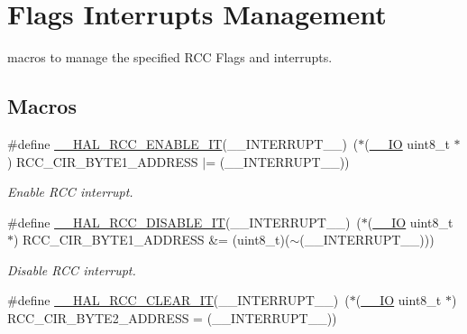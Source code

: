 \hypertarget{group___r_c_c___flags___interrupts___management}{\section{Flags Interrupts Management}
\label{group___r_c_c___flags___interrupts___management}
}


macros to manage the specified R\-C\-C Flags and interrupts.  


\subsection*{Macros}
\begin{DoxyCompactItemize}
\item 
\#define \hyperlink{group___r_c_c___flags___interrupts___management_ga180fb20a37b31a6e4f7e59213a6c0405}{\-\_\-\-\_\-\-H\-A\-L\-\_\-\-R\-C\-C\-\_\-\-E\-N\-A\-B\-L\-E\-\_\-\-I\-T}(\-\_\-\-\_\-\-I\-N\-T\-E\-R\-R\-U\-P\-T\-\_\-\-\_\-)~($\ast$(\hyperlink{core__sc300_8h_aec43007d9998a0a0e01faede4133d6be}{\-\_\-\-\_\-\-I\-O} uint8\-\_\-t $\ast$) R\-C\-C\-\_\-\-C\-I\-R\-\_\-\-B\-Y\-T\-E1\-\_\-\-A\-D\-D\-R\-E\-S\-S $\vert$= (\-\_\-\-\_\-\-I\-N\-T\-E\-R\-R\-U\-P\-T\-\_\-\-\_\-))
\begin{DoxyCompactList}\small\item\em Enable R\-C\-C interrupt. \end{DoxyCompactList}\item 
\#define \hyperlink{group___r_c_c___flags___interrupts___management_gafc4df8cd4df0a529d11f18bf1f7e9f50}{\-\_\-\-\_\-\-H\-A\-L\-\_\-\-R\-C\-C\-\_\-\-D\-I\-S\-A\-B\-L\-E\-\_\-\-I\-T}(\-\_\-\-\_\-\-I\-N\-T\-E\-R\-R\-U\-P\-T\-\_\-\-\_\-)~($\ast$(\hyperlink{core__sc300_8h_aec43007d9998a0a0e01faede4133d6be}{\-\_\-\-\_\-\-I\-O} uint8\-\_\-t $\ast$) R\-C\-C\-\_\-\-C\-I\-R\-\_\-\-B\-Y\-T\-E1\-\_\-\-A\-D\-D\-R\-E\-S\-S \&= (uint8\-\_\-t)($\sim$(\-\_\-\-\_\-\-I\-N\-T\-E\-R\-R\-U\-P\-T\-\_\-\-\_\-)))
\begin{DoxyCompactList}\small\item\em Disable R\-C\-C interrupt. \end{DoxyCompactList}\item 
\#define \hyperlink{group___r_c_c___flags___interrupts___management_ga9d8ab157f58045b8daf8136bee54f139}{\-\_\-\-\_\-\-H\-A\-L\-\_\-\-R\-C\-C\-\_\-\-C\-L\-E\-A\-R\-\_\-\-I\-T}(\-\_\-\-\_\-\-I\-N\-T\-E\-R\-R\-U\-P\-T\-\_\-\-\_\-)~($\ast$(\hyperlink{core__sc300_8h_aec43007d9998a0a0e01faede4133d6be}{\-\_\-\-\_\-\-I\-O} uint8\-\_\-t $\ast$) R\-C\-C\-\_\-\-C\-I\-R\-\_\-\-B\-Y\-T\-E2\-\_\-\-A\-D\-D\-R\-E\-S\-S = (\-\_\-\-\_\-\-I\-N\-T\-E\-R\-R\-U\-P\-T\-\_\-\-\_\-))

\end{DoxyCompactItemize}
